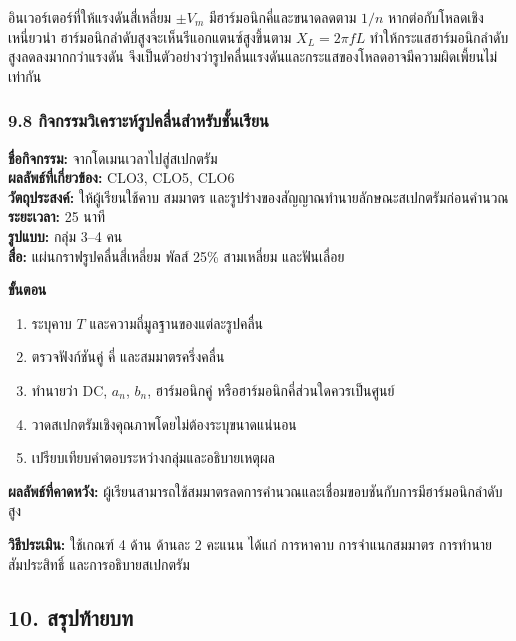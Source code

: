 อินเวอร์เตอร์ที่ให้แรงดันสี่เหลี่ยม \(\pm V_m\) มีฮาร์มอนิกคี่และขนาดลดตาม \(1/n\) หากต่อกับโหลดเชิงเหนี่ยวนำ ฮาร์มอนิกลำดับสูงจะเห็นรีแอกแตนซ์สูงขึ้นตาม \(X_L=2\pi fL\) ทำให้กระแสฮาร์มอนิกลำดับสูงลดลงมากกว่าแรงดัน จึงเป็นตัวอย่างว่ารูปคลื่นแรงดันและกระแสของโหลดอาจมีความผิดเพี้ยนไม่เท่ากัน

\subsubsection{9.8 กิจกรรมวิเคราะห์รูปคลื่นสำหรับชั้นเรียน}

\textbf{ชื่อกิจกรรม:} จากโดเมนเวลาไปสู่สเปกตรัม\\
\textbf{ผลลัพธ์ที่เกี่ยวข้อง:} CLO3, CLO5, CLO6\\
\textbf{วัตถุประสงค์:} ให้ผู้เรียนใช้คาบ สมมาตร และรูปร่างของสัญญาณทำนายลักษณะสเปกตรัมก่อนคำนวณ\\
\textbf{ระยะเวลา:} 25 นาที\\
\textbf{รูปแบบ:} กลุ่ม 3--4 คน\\
\textbf{สื่อ:} แผ่นกราฟรูปคลื่นสี่เหลี่ยม พัลส์ 25\% สามเหลี่ยม และฟันเลื่อย

\textbf{ขั้นตอน}

\begin{enumerate}
\def\labelenumi{\arabic{enumi}.}
\item
  ระบุคาบ \(T\) และความถี่มูลฐานของแต่ละรูปคลื่น
\item
  ตรวจฟังก์ชันคู่ คี่ และสมมาตรครึ่งคลื่น
\item
  ทำนายว่า DC, \(a_n\), \(b_n\), ฮาร์มอนิกคู่ หรือฮาร์มอนิกคี่ส่วนใดควรเป็นศูนย์
\item
  วาดสเปกตรัมเชิงคุณภาพโดยไม่ต้องระบุขนาดแน่นอน
\item
  เปรียบเทียบคำตอบระหว่างกลุ่มและอธิบายเหตุผล
\end{enumerate}

\textbf{ผลลัพธ์ที่คาดหวัง:} ผู้เรียนสามารถใช้สมมาตรลดการคำนวณและเชื่อมขอบชันกับการมีฮาร์มอนิกลำดับสูง

\textbf{วิธีประเมิน:} ใช้เกณฑ์ 4 ด้าน ด้านละ 2 คะแนน ได้แก่ การหาคาบ การจำแนกสมมาตร การทำนายสัมประสิทธิ์ และการอธิบายสเปกตรัม


\subsection{10. สรุปท้ายบท}

